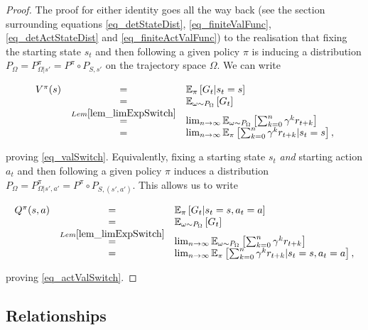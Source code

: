 \documentclass[11pt]{article} %
\begin{document}
\begin{proof}
	The proof for either identity goes all the way back (see the section surrounding equations \ref{eq_detStateDist}, \ref{eq_finiteValFunc}, \ref{eq_detActStateDist} and \ref{eq_finiteActValFunc}) to the realisation that fixing the starting state $s_t$  and then following a given policy $\pi$ is inducing a distribution $P_{\Omega} = P_{\Omega | s'}^{\pi} = P^{\pi} \circ P_{S,s'}$ on the trajectory space $\Omega$. We can write

	\begin{equation}
		\begin{array}{rcl}
		V^{\pi}(s) & = & \mathbb{E}_{\pi}\left[ G_t | s_t = s \right] \\
				& = & \mathbb{E}_{\omega \sim P_\Omega}\left[ G_t \right] \\
				& \overset{Lem \ref{lem_limExpSwitch}}{=} & \lim_{n \rightarrow \infty} \mathbb{E}_{\omega \sim P_\Omega}\left[ \sum_{k=0}^n \gamma^k r_{t+k} \right] \\
				& = & \lim_{n \rightarrow \infty} \mathbb{E}_{\pi}\left[ \sum_{k=0}^n \gamma^k r_{t+k} | s_t = s \right],
		\end{array}
	\end{equation}

	proving \ref{eq_valSwitch}. Equivalently, fixing a starting state $s_t$ \textit{and} starting action $a_t$ and then following a given policy $\pi$ induces a distribution $P_{\Omega} = P_{\Omega | s',a'}^{\pi} = P^{\pi} \circ P_{S,(s',a')}$. This allows us to write

	\begin{equation}
		\begin{array}{rcl}
		Q^{\pi}(s,a) & = & \mathbb{E}_{\pi}\left[ G_t | s_t = s, a_t = a \right] \\
				& = & \mathbb{E}_{\omega \sim P_\Omega}\left[ G_t \right] \\
				& \overset{Lem \ref{lem_limExpSwitch}}{=} & \lim_{n \rightarrow \infty} \mathbb{E}_{\omega \sim P_\Omega}\left[ \sum_{k=0}^n \gamma^k r_{t+k} \right] \\
				& = & \lim_{n \rightarrow \infty} \mathbb{E}_{\pi}\left[ \sum_{k=0}^n \gamma^k r_{t+k} | s_t = s, a_t = a \right],
		\end{array}
	\end{equation}

	proving \ref{eq_actValSwitch}.

\end{proof}

\subsection{Relationships}
\end{document}
